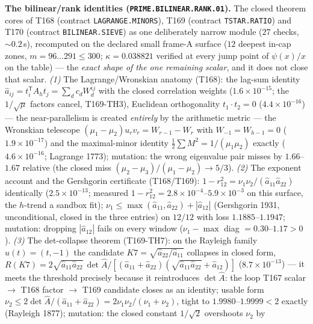 \par\smallskip\noindent\textbf{The bilinear/rank identities
(\texttt{PRIME.BILINEAR.RANK.01}).}
The closed theorem cores of T168 (contract \texttt{LAGRANGE.MINORS}),
T169 (contract \texttt{TSTAR.RATIO}) and T170 (contract
\texttt{BILINEAR.SIEVE}) as one deliberately narrow module ($27$ checks,
${\sim}0.2$\,s), recomputed on the declared small frame-A surface ($12$
deepest in-cap zones, $m=96\ldots291\le300$; $\kappa=0.038821$ verified
at every jump point of $\psi(x)/x$ on the table) --- the \emph{exact
shape of the one remaining scalar}, and it does not close that scalar.
\emph{(1)} The Lagrange/Wronskian anatomy (T168): the lag-sum identity
$\hat a_{ij}=t_i^{\mathsf T}A_ht_j=\sum_d c_dW^{ij}_d$ with the closed
correlation weights ($1.6\times10^{-15}$; the $1/\sqrt{\mu}$ factors
cancel, T169-TH3), Euclidean orthogonality $t_1\cdot t_2=0$
($4.4\times10^{-16}$) --- the near-parallelism is created \emph{entirely}
by the arithmetic metric --- the Wronskian telescope
$(\mu_1-\mu_2)u_rv_r=W_{r-1}-W_r$ with $W_{-1}=W_{h-1}=0$
($1.9\times10^{-17}$) and the maximal-minor identity
$\tfrac12\sum M^2=1/(\mu_1\mu_2)$ exactly ($4.6\times10^{-16}$; Lagrange
1773); mutation: the wrong eigenvalue pair misses by $1.66$--$1.67$
relative (the closed miss $(\mu_2-\mu_3)/(\mu_1-\mu_2)\to5/3$).
\emph{(2)} The exponent account and the Gershgorin certificate
(T168/T169): $1-r_{12}^2=\nu_1\nu_2/(\hat a_{11}\hat a_{22})$
identically ($2.5\times10^{-13}$; measured
$1-r_{12}^2=2.8\times10^{-4}$--$5.9\times10^{-3}$ on this surface, the
$h$-trend a sandbox fit); $\nu_1\le\max(\hat a_{11},\hat a_{22})+
|\hat a_{12}|$ (Gershgorin 1931, unconditional, closed in the three
entries) on $12/12$ with loss $1.1885$--$1.1947$; mutation: dropping
$|\hat a_{12}|$ fails on every window ($\nu_1-\max$ diag
$=0.30$--$1.17>0$).
\emph{(3)} The det-collapse theorem (T169-TH7): on the Rayleigh family
$u(t)=(t,-1)$ the candidate $K7=\sqrt{\hat a_{22}/\hat a_{11}}$
collapses in closed form,
$R(K7)=2\sqrt{\hat a_{11}\hat a_{22}}\,\det\hat A/[(\hat a_{11}+
\hat a_{22})(\sqrt{\hat a_{11}\hat a_{22}}+\hat a_{12})]$
($8.7\times10^{-13}$) --- it meets the threshold precisely because it
reintroduces $\det\hat A$: the loop T167 scalar $\to$ T168 factor $\to$
T169 candidate closes as an identity; usable form
$\nu_2\le2\det\hat A/(\hat a_{11}+\hat a_{22})=2\nu_1\nu_2/(\nu_1+\nu_2)$,
tight to $1.9980$--$1.9999<2$ exactly (Rayleigh 1877); mutation: the
closed constant $1/\sqrt2$ overshoots $\nu_2$ by
